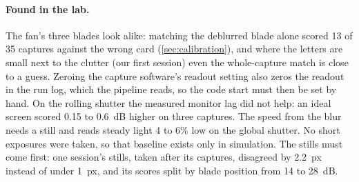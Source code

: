 \paragraph{Found in the lab.} The fan's three blades look alike: matching the deblurred blade alone
scored 13 of 35 captures against the wrong card (\cref{sec:calibration}), and where the letters are
small next to the clutter (our first session) even the whole-capture match is close to a guess. Zeroing the capture software's readout setting also zeros the readout in the run log, which the pipeline reads, so the code start must then be set by hand. On the rolling shutter
the measured monitor lag did not help: an ideal screen scored 0.15 to \SI{0.6}{dB} higher on three
captures. The speed from the blur needs a still and reads steady light 4 to 6\% low on the global shutter. No short exposures were taken, so
that baseline exists only in simulation. The stills must come first: one session's stills, taken after its captures, disagreed by \SI{2.2}{px} instead of under \SI{1}{px}, and its scores split by blade position from 14 to \SI{28}{dB}. 
